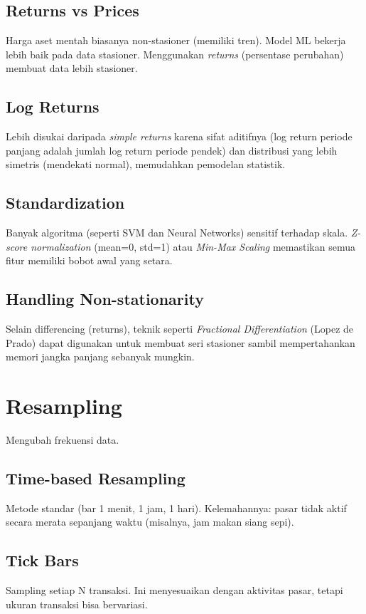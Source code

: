 \documentclass[12pt,a4paper]{book}
\begin{document}
\subsection{Returns vs Prices}
Harga aset mentah biasanya non-stasioner (memiliki tren). Model ML bekerja lebih baik pada data stasioner. Menggunakan \textit{returns} (persentase perubahan) membuat data lebih stasioner.

\subsection{Log Returns}
Lebih disukai daripada \textit{simple returns} karena sifat aditifnya (log return periode panjang adalah jumlah log return periode pendek) dan distribusi yang lebih simetris (mendekati normal), memudahkan pemodelan statistik.

\subsection{Standardization}
Banyak algoritma (seperti SVM dan Neural Networks) sensitif terhadap skala. \textit{Z-score normalization} (mean=0, std=1) atau \textit{Min-Max Scaling} memastikan semua fitur memiliki bobot awal yang setara.

\subsection{Handling Non-stationarity}
Selain differencing (returns), teknik seperti \textit{Fractional Differentiation} (Lopez de Prado) dapat digunakan untuk membuat seri stasioner sambil mempertahankan memori jangka panjang sebanyak mungkin.

\section{Resampling}
Mengubah frekuensi data.

\subsection{Time-based Resampling}
Metode standar (bar 1 menit, 1 jam, 1 hari). Kelemahannya: pasar tidak aktif secara merata sepanjang waktu (misalnya, jam makan siang sepi).

\subsection{Tick Bars}
Sampling setiap N transaksi. Ini menyesuaikan dengan aktivitas pasar, tetapi ukuran transaksi bisa bervariasi.
\end{document}
